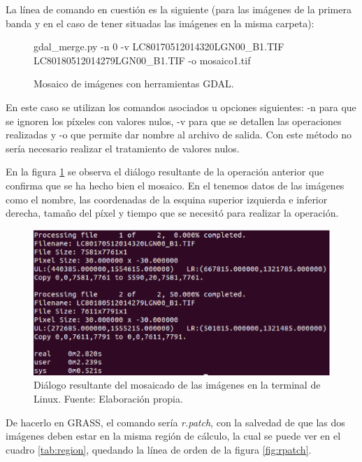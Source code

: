 La línea de comando en cuestión es la siguiente (para las imágenes de la primera banda y en el caso de tener situadas las imágenes en la misma carpeta):

\begin{figure}[ht]
\centering
\begin{boxedverbatim}
	gdal_merge.py -n 0 -v LC80170512014320LGN00_B1.TIF 
	LC80180512014279LGN00_B1.TIF -o mosaico1.tif
\end{boxedverbatim}
\caption[Mosaico de imágenes]{Mosaico de imágenes con herramientas GDAL.}
\end{figure}

En este caso se utilizan los comandos asociados u opciones siguientes: -n para que se ignoren los píxeles con valores nulos, -v para que se detallen las operaciones realizadas y -o que permite dar nombre al archivo de salida. Con este método no sería necesario realizar el tratamiento de valores nulos.\Sep

En la figura \ref{fig:dialogomosaico} se observa el diálogo resultante de la operación anterior que confirma que se ha hecho bien el mosaico. En el tenemos datos de las imágenes como el nombre, las coordenadas de la esquina superior izquierda e inferior derecha, tamaño del píxel y tiempo que se necesitó para realizar la operación.\Sep

\begin{figure}
	\centering
	\includegraphics[width=0.8\linewidth]{./Imagenes/Dialogo_mosaico.eps}
	\caption[Diálogo del mosaicado]{Diálogo resultante del mosaicado de las imágenes en la terminal de Linux. Fuente: Elaboración propia.}
	\label{fig:dialogomosaico}
\end{figure}

De hacerlo en GRASS, el comando sería \textit{r.patch}, con la salvedad de que las dos imágenes deben estar en la misma región de cálculo, la cual se puede ver en el cuadro \ref{tab:region}, quedando la línea de orden de la figura \ref{fig:rpatch}.

